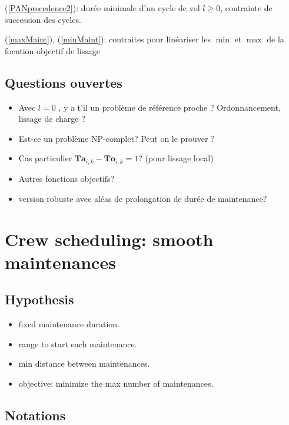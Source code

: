 \documentclass[a4paper,11pt]{article}
\begin{document}
    (\ref{PANprecedence2}): durée minimale d'un cycle de vol $l\geqslant 0$, contrainte de succession des cycles.

    (\ref{maxMaint}), (\ref{minMaint}): contraites pour linéariser les $\min$ et $\max$ de la focntion objectif de lissage

    \subsection{Questions ouvertes}

    \begin{itemize}
    \item Avec $l=0$ , y a t'il un problème de référence proche ? Ordonnancement, lissage de charge ?
    \item Est-ce un problème NP-complet? Peut on le prouver ?
     \item Cas particulier $\mathbf{Ta}_{i,k}-\mathbf{To}_{i,k}=1$? (pour lissage local)
     \item Autres fonctions objectifs?
     \item version robuste avec aléas de prolongation de durée de maintenance?
    \end{itemize}

\clearpage

\section{Crew scheduling: smooth maintenances}

    \subsection{Hypothesis}

    \begin{itemize}
     \item fixed maintenance duration.
     \item range to start each maintenance.
     \item min distance between maintenances.
     \item objective: minimize the max number of maintenances.
    \end{itemize}

    \subsection{Notations}
\end{document}
